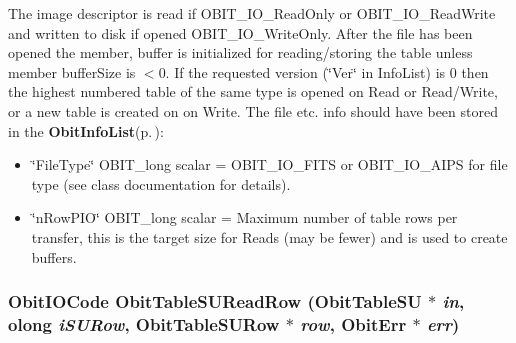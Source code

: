 The image descriptor is read if OBIT\_\-IO\_\-Read\-Only or OBIT\_\-IO\_\-Read\-Write and written to disk if opened OBIT\_\-IO\_\-Write\-Only. After the file has been opened the member, buffer is initialized for reading/storing the table unless member buffer\-Size is $<$0. If the requested version (\char`\"{}Ver\char`\"{} in Info\-List) is 0 then the highest numbered table of the same type is opened on Read or Read/Write, or a new table is created on on Write. The file etc. info should have been stored in the {\bf Obit\-Info\-List}{\rm (p.\,\pageref{structObitInfoList})}: \begin{itemize}
\item \char`\"{}File\-Type\char`\"{} OBIT\_\-long scalar = OBIT\_\-IO\_\-FITS or OBIT\_\-IO\_\-AIPS for file type (see class documentation for details). \item \char`\"{}n\-Row\-PIO\char`\"{} OBIT\_\-long scalar = Maximum number of table rows per transfer, this is the target size for Reads (may be fewer) and is used to create buffers. 
\end{itemize}
\subsubsection{\setlength{\rightskip}{0pt plus 5cm}Obit\-IOCode Obit\-Table\-SURead\-Row ({\bf Obit\-Table\-SU} $\ast$ {\em in}, {\bf olong} {\em i\-SURow}, {\bf Obit\-Table\-SURow} $\ast$ {\em row}, {\bf Obit\-Err} $\ast$ {\em err})}\label{ObitTableSU_8h_a18}


